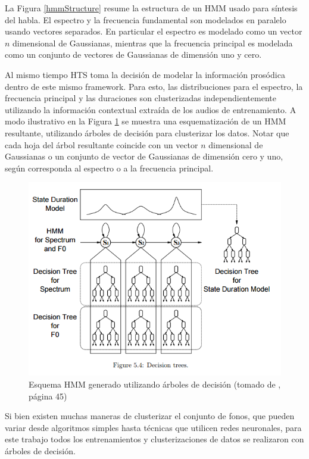 La Figura \ref{hmmStructure} resume la estructura de un HMM usado para síntesis del habla. El espectro y la frecuencia fundamental son modelados en paralelo usando vectores separados. En particular el espectro es modelado como un vector $n$ dimensional de Gaussianas, mientras que la frecuencia principal es modelada como un conjunto de vectores de Gaussianas de dimensión uno y cero.

Al mismo tiempo HTS toma la decisión de modelar la información prosódica dentro de este mismo framework. Para esto, las distribuciones para el espectro, la frecuencia principal y las duraciones son clusterizadas independientemente utilizando la información contextual extraída de los audios de entrenamiento. A modo ilustrativo en la Figura \ref{hmmTree} se muestra una esquematización de un HMM resultante, utilizando árboles de decisión para clusterizar los datos. Notar que cada hoja del árbol resultante coincide con un vector $n$ dimensional de Gaussianas o un conjunto de vector de Gaussianas de dimensión cero y uno, según corresponda al espectro o a la frecuencia principal.

\begin{figure}
\includegraphics[scale=0.5]{imagenes/hmmContext.png}
\caption{Esquema HMM generado utilizando árboles de decisión (tomado de \cite{phoneticAndProsodic}, página 45)}
\label{hmmTree}
\centering
\end{figure}

Si bien existen muchas maneras de clusterizar el conjunto de fonos, que pueden variar desde algoritmos simples hasta técnicas que utilicen redes neuronales, para este trabajo todos los entrenamientos y clusterizaciones de datos se realizaron con árboles de decisión. 

